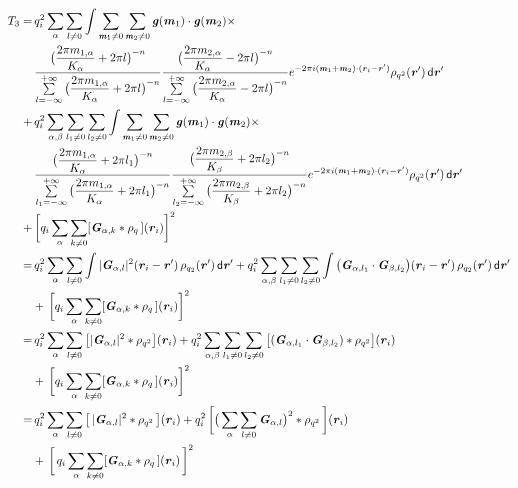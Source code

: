 \documentclass[aps,pre,preprint]{revtex4}
\renewcommand{\v}[1]{\textbf{\textit{#1}}}
\renewcommand{\d}[1]{\textsf{#1}}
\begin{document}
\begin{align}\nonumber
  T_3 = &\,
  q_i^2\sum_{\alpha}\sum_{l\neq 0}
  \int
  \sum_{\v m_1\neq 0}\sum_{\v m_2\neq 0}
  \v g(\v m_1)\cdot\v g(\v m_2) \times\\\nonumber
  &\,
  \frac
  {\big(\dfrac{2\pi m_{1,\alpha}}{K_\alpha} + 2\pi l\big)^{-n}}
  {\sum\limits_{l=-\infty}^{+\infty}
    \big(\dfrac{2\pi m_{1,\alpha}}{K_\alpha} + 2\pi l\big)^{-n}}
  \frac
  {\big(\dfrac{2\pi m_{2,\alpha}}{K_\alpha} - 2\pi l\big)^{-n}}
  {\sum\limits_{l=-\infty}^{+\infty}
    \big(\dfrac{2\pi m_{2,\alpha}}{K_\alpha} - 2\pi l\big)^{-n}}
  e^{-2\pi i (\v m_1 + \v m_2)\cdot(\v r_i - \v r')}\rho_{q^2}(\v r')
  \,\d d\v r' \\\nonumber
  + & \,
  q_i^2\sum_{\alpha, \beta}\sum_{l_1\neq 0}\sum_{l_2\neq 0}
  \int
  \sum_{\v m_1\neq 0}\sum_{\v m_2\neq 0}
  \v g(\v m_1)\cdot\v g(\v m_2) \times\\\nonumber
  &\,
  \frac
  {\big(\dfrac{2\pi m_{1,\alpha}}{K_\alpha} + 2\pi l_1\big)^{-n}}
  {\sum\limits_{l_1=-\infty}^{+\infty}
    \big(\dfrac{2\pi m_{1,\alpha}}{K_\alpha} + 2\pi l_1\big)^{-n}}
  \frac
  {\big(\dfrac{2\pi m_{2,\beta}}{K_\beta} + 2\pi l_2\big)^{-n}}
  {\sum\limits_{l_2=-\infty}^{+\infty}
    \big(\dfrac{2\pi m_{2,\beta}}{K_\beta} + 2\pi l_2\big)^{-n}}  
  e^{-2\pi i (\v m_1 + \v m_2)\cdot(\v r_i - \v r')}\rho_{q^2}(\v r')
  \,\d d\v r' \\\nonumber
  + &\,
  \bigg[
  q_i \sum_{\alpha}\sum_{k\neq 0}
  [\v G_{\alpha,k}\ast\rho_q\,] (\v r_i)
  \bigg]^2  \\\nonumber
  = &\,
  q_i^2\sum_{\alpha}\sum_{l\neq 0}
  \int \vert \v G_{\alpha,l}\vert^2(\v r_i - \v r')
  \,\rho_{q_2}(\v r')
  \,\d d\v r'
  +
  q_i^2\sum_{\alpha, \beta}\sum_{l_1\neq 0}\sum_{l_2\neq 0}
  \int
  \big(
  \v G_{\alpha,l_1}\cdot\v G_{\beta,l_2}
  \big)
  (\v r_i - \v r')
  \,\rho_{q_2}(\v r')
  \,\d d\v r'
  \\\nonumber
  &+ \,
  \bigg[
  q_i \sum_{\alpha}\sum_{k\neq 0}
  [\v G_{\alpha,k}\ast\rho_q\,] (\v r_i)
  \bigg]^2  \\\nonumber
  = &\,
  q_i^2\sum_{\alpha}\sum_{l\neq 0}
  \big[
  \vert\v G_{\alpha,l}\vert^2 \ast\rho_{q^2}
  \big](\v r_i)
  +
  q_i^2\sum_{\alpha, \beta}\sum_{l_1\neq 0}\sum_{l_2\neq 0}
  \big[
  (
  \v G_{\alpha,l_1}\cdot\v G_{\beta,l_2}
  )
  \ast\rho_{q^2}
  \big]
  (\v r_i) \\\nonumber
  &+ \,
  \bigg[
  q_i \sum_{\alpha}\sum_{k\neq 0}
  [\v G_{\alpha,k}\ast\rho_q\,] (\v r_i)
  \bigg]^2  \\\nonumber
    = &\,
  q_i^2
  \sum_{\alpha} \sum_{l\neq 0}
  \big[\,
  \vert \v G_{\alpha,l}\vert^2
  \ast \rho_{q^2}
  \,\big] (\v r_i)
  +
  q_i^2\,
  \bigg[
  \big(
  \sum_{\alpha} \sum_{l\neq 0}  
  \v G_{\alpha,l}
  \big)^2
  \ast \rho_{q^2}\,
  \bigg] (\v r_i) \\
  &+ \,
  \bigg[\,
  q_i \sum_{\alpha}\sum_{k\neq 0}
  [\v G_{\alpha,k}\ast\rho_q\,] (\v r_i)
  \,\bigg]^2 
\end{align}
\end{document}

